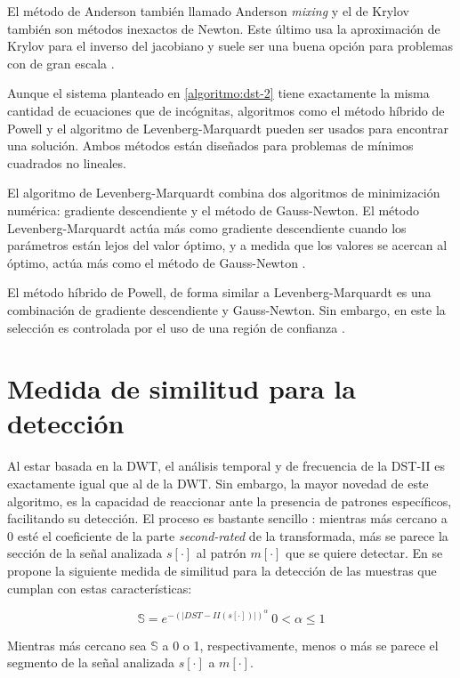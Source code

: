 El método de Anderson también llamado Anderson \textit{mixing} \cite{Eyert1996} y el de Krylov también son métodos inexactos de Newton. 
Este último usa la aproximación de Krylov para el inverso del jacobiano y suele ser una buena opción para problemas
con de gran escala \cite{kelley1995iterative}.

Aunque el sistema planteado en \ref{algoritmo:dst-2} tiene exactamente la misma cantidad de ecuaciones que de 
incógnitas, algoritmos como el método híbrido de Powell y el algoritmo de Levenberg-Marquardt pueden 
ser usados para encontrar una solución. Ambos métodos están diseñados para problemas de mínimos cuadrados no lineales.

El algoritmo de Levenberg-Marquardt combina dos algoritmos de minimización numérica:
gradiente descendiente y el método de Gauss-Newton. El método Levenberg-Marquardt actúa más como gradiente 
descendiente cuando los parámetros están lejos del valor óptimo, y a medida que los valores se acercan 
al óptimo, actúa más como el método de Gauss-Newton \cite{madsen2004methods}.

El método híbrido de Powell, de forma similar a Levenberg-Marquardt es una combinación de gradiente descendiente y Gauss-Newton.
Sin embargo, en este la selección es controlada por el uso de una región de confianza \cite{madsen2004methods}.

\section{Medida de similitud para la detección}

Al estar basada en la DWT, el análisis temporal y de frecuencia de la DST-II es exactamente igual que al de la DWT.
Sin embargo, la mayor novedad de este algoritmo, es la capacidad de reaccionar ante la presencia de 
patrones específicos, facilitando su detección. El proceso es bastante sencillo :
mientras más cercano a $0$ esté el coeficiente de la parte \textit{second-rated} de la transformada, más se parece
la sección de la señal analizada $s[\cdot]$ al patrón $m[\cdot]$ que se quiere detectar. En \cite{Guido2018} se
propone la siguiente medida de similitud para la detección de las muestras que cumplan con estas características:

\begin{equation}
	\mathbb{S} = e^{-{(|DST-II(s[\cdot])|)}^{\alpha}} \ 0 < \alpha \leq 1
\end{equation}\label{eq:s-heuristic}

Mientras más cercano sea $\mathbb{S}$ a 0 o 1, respectivamente, menos o más se parece el segmento de
la señal analizada $s[\cdot]$ a $m[\cdot]$.


